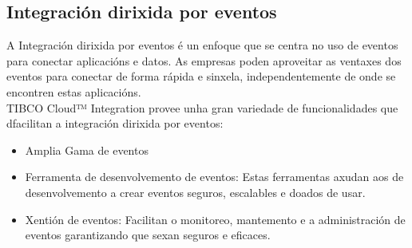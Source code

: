 \begin{flushleft}
\section{Integración dirixida por eventos}
A Integración dirixida por eventos é un enfoque que se centra no uso de eventos para conectar aplicacións e datos. As empresas poden aproveitar as ventaxes dos eventos para conectar de forma rápida e sinxela, independentemente de onde se encontren estas aplicacións. \\
TIBCO Cloud™ Integration provee unha gran variedade de funcionalidades que  dfacilitan a integración dirixida por eventos:\\
\begin{itemize}
    \item Amplia Gama de eventos
    \item Ferramenta de desenvolvemento de eventos: Estas ferramentas axudan aos de desenvolvemento a crear eventos seguros, escalables e doados de usar.
    \item Xentión de eventos: Facilitan o monitoreo, mantemento e a administración de eventos garantizando que sexan seguros e eficaces.
\end{itemize}
\end{flushleft}
